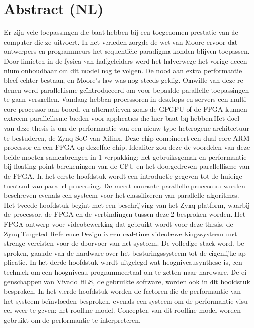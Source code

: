 
\chapter*{Abstract (NL)}

\begin{otherlanguage}{dutch}


Er zijn vele toepassingen die baat hebben bij een toegenomen prestatie van de computer die ze uitvoert. In het verleden zorgde de wet van Moore ervoor dat ontwerpers en programmeurs het sequenti\"ele paradigma konden blijven toepassen. Door limieten in de fysica van halfgeleiders werd het halverwege het vorige decennium onhoudbaar om dit model nog te volgen. De nood aan extra performantie bleef echter bestaan, en Moore's law was nog steeds geldig. Omwille van deze redenen werd parallellisme ge\"introduceerd om voor bepaalde parallelle toepassingen te gaan versnellen. Vandaag hebben processoren in desktops en servers een multi-core processor aan boord, en alternatieven zoals de GPGPU of de FPGA kunnen extreem parallellisme bieden voor applicaties die hier baat bij hebben.Het doel van deze thesis is om de performantie van een nieuw type heterogene architectuur te bestuderen, de Zynq SoC van Xilinx. Deze chip combineert een dual core ARM processor en een FPGA op dezelfde chip. Idealiter zou deze de voordelen van deze beide moeten samenbrengen in 1 verpakking: het gebruiksgemak en performantie bij floating-point berekeningen van de CPU en het doorgedreven parallellisme van de FPGA.
In het eerste hoofdstuk wordt een introductie gegeven tot de huidige toestand van parallel processing. De meest courante parallelle processors worden beschreven evenals een systeem voor het classificeren van parallelle algoritmes. Het tweede hoofdstuk begint met een beschrijving van het Zynq platform, waarbij de processor, de FPGA en de verbindingen tussen deze 2 besproken worden. Het FPGA ontwerp voor videobewerking dat gebruikt wordt voor deze thesis, de Zynq Targeted Reference Design is een real-time videobewerkingssysteem met strenge vereisten voor de doorvoer van het systeem. De volledige stack wordt besproken, gaande van de hardware over het besturingssysteem tot de eigenlijke applicatie. In het derde hoofdstuk wordt uitgelegd wat hoogniveausynthese is, een techniek om een hoogniveau programmeertaal om te zetten naar hardware. De eigenschappen van Vivado HLS, de gebruikte software, worden ook in dit hoofdstuk besproken. In het vierde hoofdstuk worden de factoren die de performantie van het systeem be\"invloeden besproken, evenals een systeem om de performantie visueel weer te geven:  het roofline model. Concepten van dit roofline model worden gebruikt om de performantie te interpreteren. 

\end{otherlanguage}